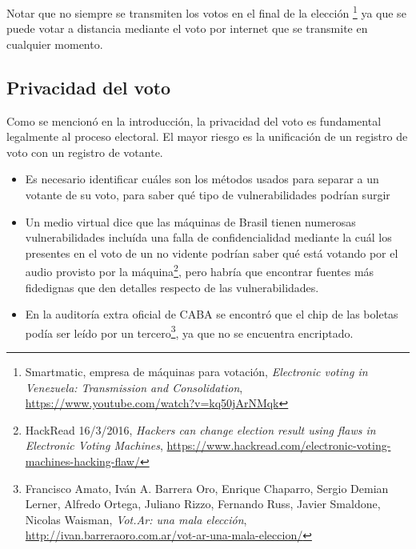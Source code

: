 \documentclass[a4,11pt]{article}
\begin{document}


Notar que no siempre se transmiten los votos en el final de la elección \footnote{Smartmatic, empresa de máquinas para votación, \textit{Electronic voting in Venezuela: Transmission and Consolidation}, \url{https://www.youtube.com/watch?v=kq50jArNMqk}} ya que se puede votar a distancia mediante el voto por internet que se transmite en cualquier momento.


\subsection{Privacidad del voto}

Como se mencionó en la introducción, la privacidad del voto es fundamental legalmente al proceso electoral. El mayor riesgo es la unificación de un registro de voto con un registro de votante.

\begin{itemize}
\item Es necesario identificar cuáles son los métodos usados para separar a un votante de su voto, para saber qué tipo de vulnerabilidades podrían surgir
\item Un medio virtual dice que las máquinas de Brasil tienen numerosas vulnerabilidades incluída una falla de confidencialidad mediante la cuál los presentes en el voto de un no vidente podrían saber qué está votando por el audio provisto por la máquina\footnote{HackRead 16/3/2016, \textit{Hackers can change election result using flaws in Electronic Voting Machines}, \url{https://www.hackread.com/electronic-voting-machines-hacking-flaw/}}, pero habría que encontrar fuentes más fidedignas que den detalles respecto de las vulnerabilidades.
\item En la auditoría extra oficial de CABA se encontró que el chip de las boletas podía ser leído por un tercero\footnote{Francisco Amato, Iván A. Barrera Oro, Enrique Chaparro, Sergio Demian Lerner, Alfredo Ortega, Juliano Rizzo, Fernando Russ, Javier Smaldone, Nicolas Waisman, \textit{Vot.Ar: una mala elección}, \url{http://ivan.barreraoro.com.ar/vot-ar-una-mala-eleccion/}}, ya que no se encuentra encriptado.
\end{itemize}
\end{document}
